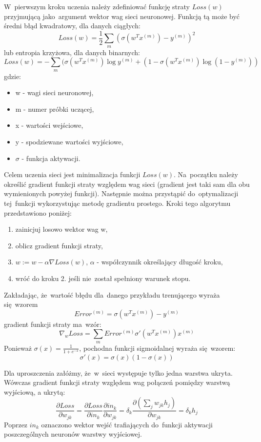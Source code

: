 W~pierwszym kroku uczenia należy zdefiniować funkcję straty $Loss(w)$ przyjmującą jako~argument wektor wag
sieci neuronowej. Funkcją tą może być średni błąd kwadratowy, dla danych ciągłych:\\
$$Loss(w)=\frac{1}{2}\sum\limits_{m}(\sigma(w^{T}x^{(m)}) - y^{(m)})^2$$
lub entropia krzyżowa, dla danych binarnych:
$$Loss(w)=-\sum\limits_m(\sigma(w^{T}x^{(m)})\log{y^{(m)}} + (1-\sigma(w^{T}x^{(m)})\log{(1-y^{(m)})})
$$
gdzie:
\begin{itemize}
  \item w - wagi sieci neuronowej,
  \item m - numer próbki uczącej,
  \item x - wartości wejściowe,
  \item y - spodziewane wartości wyjściowe,
  \item $\sigma$ - funkcja aktywacji.
\end{itemize}

Celem uczenia sieci jest minimalizacja funkcji $Loss(w)$. Na~początku należy określić gradient funkcji straty
względem wag sieci (gradient jest taki sam dla obu wymienionych powyżej funkcji).
Następnie można przystąpić do~optymalizacji tej~funkcji wykorzystując metodę gradientu prostego.
Kroki tego algorytmu przedstawiono poniżej:
\begin{enumerate}
  \item zainicjuj losowo wektor wag w,
  \item oblicz gradient funkcji straty,
  \item $w:=w-\alpha \nabla Loss(w)$, $\alpha$ - współczynnik określający długość kroku,
  \item wróć do kroku 2. jeśli nie~został spełniony warunek stopu.
\end{enumerate}

Zakładając, że~wartość błędu dla~danego przykładu trenującego wyraża się~wzorem
$$Error^{(m)}=\sigma(w^{T}x^{(m)})-y^{(m)}$$
gradient funkcji straty ma~wzór:
$$\nabla_{w}Loss=\sum\limits_{m}Error^{(m)}\sigma'(w^{T}x^{(m)})x^{(m)}$$
Ponieważ $\sigma(x)=\frac{1}{1+e^{-x}}$, pochodna funkcji sigmoidalnej wyraża się~wzorem:
$$\sigma'(x)=\sigma(x)(1-\sigma(x))$$

Dla uproszczenia załóżmy, że~w~sieci występuje tylko jedna warstwa ukryta. Wówczas gradient funkcji straty
względem wag połączeń pomiędzy warstwą wyjściową, a ukrytą:
$$\frac{\partial Loss}{\partial w_{jk}}=\frac{\partial Loss}{\partial in_k}\frac{\partial
in_k}{\partial w_{jk}}= \delta_k \frac{\partial (\sum\limits_j w_{jk}h_j)}{\partial w_{jk}} = \delta_k h_j$$
Poprzez $in_k$ oznaczono wektor wejść trafiających do~funkcji aktywacji poszczególnych neuronów warstwy
wyjściowej.

